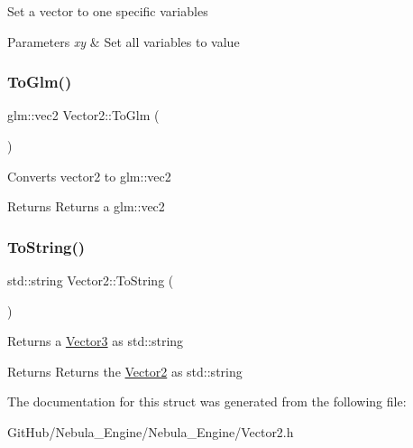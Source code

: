 Set a vector to one specific variables 
\begin{DoxyParams}{Parameters}
{\em xy} & Set all variables to value \\
\hline
\end{DoxyParams}
\mbox{\label{struct_vector2_adc634be04f1bf7f1a91811216ea6ac50}} 
\subsubsection{\texorpdfstring{ToGlm()}{ToGlm()}}
{\footnotesize\ttfamily glm\+::vec2 Vector2\+::\+To\+Glm (\begin{DoxyParamCaption}{ }\end{DoxyParamCaption})\hspace{0.3cm}{\ttfamily [inline]}}

Converts vector2 to glm\+::vec2 \begin{DoxyReturn}{Returns}
Returns a glm\+::vec2 
\end{DoxyReturn}
\mbox{\label{struct_vector2_a5954390e62401baa0d28d5b2128845fa}} 
\subsubsection{\texorpdfstring{ToString()}{ToString()}}
{\footnotesize\ttfamily std\+::string Vector2\+::\+To\+String (\begin{DoxyParamCaption}{ }\end{DoxyParamCaption})\hspace{0.3cm}{\ttfamily [inline]}}

Returns a \mbox{\hyperlink{struct_vector3}{Vector3}} as std\+::string \begin{DoxyReturn}{Returns}
Returns the \mbox{\hyperlink{struct_vector2}{Vector2}} as std\+::string 
\end{DoxyReturn}


The documentation for this struct was generated from the following file\+:\begin{DoxyCompactItemize}
\item 
Git\+Hub/\+Nebula\+\_\+\+Engine/\+Nebula\+\_\+\+Engine/Vector2.\+h\end{DoxyCompactItemize}
